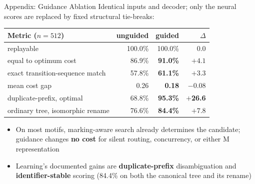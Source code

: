 \documentclass[aspectratio=169]{beamer}
\newcommand{\keyc}[1]{\textbf{\textcolor{larablue}{#1}}}
\newcommand{\keyg}[1]{\textbf{\textcolor{laraaqua!70!black}{#1}}}
\newcommand{\keya}[1]{\textbf{\textcolor{laraamber!85!black}{#1}}}
\begin{document}
\begin{frame}{Appendix: Guidance Ablation}
  Identical inputs and decoder; only the neural scores are replaced by fixed
  structural tie-breaks:
  \vspace{2mm}
  \begin{center}
  \small
  \begin{tabular}{lrrr}
    \toprule
    Metric ($n = 512$) & unguided & guided & $\Delta$ \\
    \midrule
    replayable & 100.0\% & 100.0\% & 0.0 \\
    equal to optimum cost & 86.9\% & \keyc{91.0\%} & $+4.1$ \\
    exact transition-sequence match & 57.8\% & \keyc{61.1\%} & $+3.3$ \\
    mean cost gap & 0.26 & \keyc{0.18} & $-$0.08 \\
    duplicate-prefix, optimal & 68.8\% & \keyc{95.3\%} & \keyg{$+$26.6} \\
    ordinary tree, isomorphic rename & 76.6\% & \keyc{84.4\%} & $+7.8$ \\
    \bottomrule
  \end{tabular}
  \end{center}
  \vspace{2mm}
  \begin{itemize}\setlength{\itemsep}{4pt}
    \item On most motifs, marking-aware search already determines the
      candidate; guidance changes \keya{no cost} for silent routing,
      concurrency, or either M representation
    \item Learning's documented gains are \keyc{duplicate-prefix}
      disambiguation and \keyg{identifier-stable} scoring (84.4\% on
      both the canonical tree and its rename)
  \end{itemize}
\end{frame}
\end{document}
